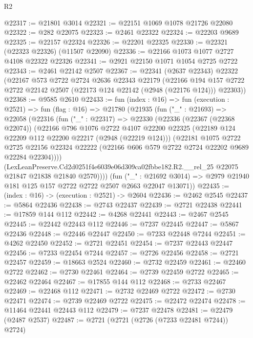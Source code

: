 \begin{lexlean}{R2}
\begin{coremodule}
@22317 := @21801 @3014
@22321 := @22151 @1069 @1078 @21726 @22080
@22322 := @282 @22075
@22323 := @2461 @22322
@22324 := @22203 @9689
@22325 := @22157 @22324
@22326 := @22201 @22325
@22330 := @22321 (@22323 @22326) (@11507 @22090)
@22336 := @22166 @1073 @1077 @2727 @4108 @22322 @22326
@22341 := @2921 @22150 @1071 @1054 @2725 @2722
@22343 := @2461 @22142 @2507
@22367 := @22341
    (@2637 @22343)
    @22322
    (@22167
      @573
      @2722
      @2724
      @2636
      @22343
      @22179
      (@22166 @194 @157 @2722 @2722 @22142 @2507 (@22173 @124 @22142 (@2948 (@22176 @124))) @22303))
@22368 := @9585 @2610
@22433 := fun (index : @16) =>
  fun (execution : @2521) =>
  fun (flag : @16) =>
  @21780
    (@21935
      (fun ("_" : @21693) =>
      @22058
        (@22316
          (fun ("_" : @22317) =>
          @22330
            (@22336
              (@22367 (@22368 @22074))
              (@22166
                @796
                @1076
                @2722
                @4107
                @22200
                @22325
                (@22189 @124 @22209 @112 @22200 @22217 (@2948 (@22219 @124)))
                (@22181
                  @1075
                  @2722
                  @2725
                  @22156
                  @22324
                  @22222
                  (@22166 @606 @579 @2722 @2724 @22202 @9689 @22284 @22304))))
            (LexLeanPreserve.Cd2d0251f4e6039e06d309ca02fbbe182.R2.__rel_25
              @22075
              @21847
              @21838
              @21840
              @2570))))
      (fun ("_" : @21692 @3014) =>
      @2979 @21940 @181 @125 @157 @2722 @2722 @2507 @2663 @22047 @13071))
@22435 := (index : @16) -> (execution : @2521) -> @2604
@22436 := @2462 @2545
@22437 := @5864 @22436
@22438 := @2743 @22437
@22439 := @2721 @22438
@22441 := @17859 @144 @112
@22442 := @4268 @22441
@22443 := @2467 @2545
@22445 := @22442 @22443 @112
@22446 := @7237 @22445
@22447 := @5867 @22436
@22448 := @22446 @22447
@22450 := @7233 @22448 @7244
@22451 := @4262 @22450
@22452 := @2721 @22451
@22454 := @7237 @22443 @22447
@22456 := @7233 @22454 @7244
@22457 := @2726 @22456
@22458 := @2721 @22457
@22459 := @18663 @2524
@22460 := @2732 @22459
@22461 := @22460 @2722
@22462 := @2730 @22461
@22464 := @2739 @22459 @2722
@22465 := @22462 @22464
@22467 := @17855 @144 @112
@22468 := @2733 @22467
@22469 := @22468 @112
@22471 := @2732 @22469 @2722
@22472 := @2730 @22471
@22474 := @2739 @22469 @2722
@22475 := @22472 @22474
@22478 := @11464 @22441 @22443 @112
@22479 := @7237 @22478
@22481 := @22479 (@2487 @2537)
@22487 := @2721 (@2721 (@2726 (@7233 @22481 @7244)) @2724)

\end{coremodule}
\end{lexlean}
